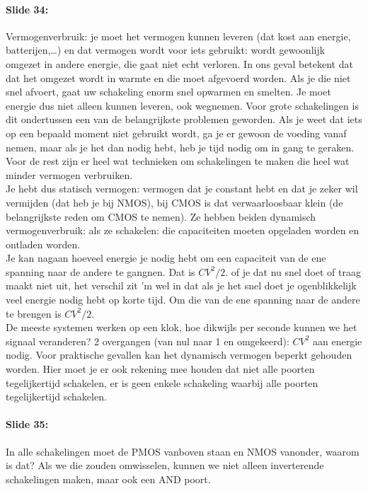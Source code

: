 \documentclass[10pt,a4paper]{book}
\begin{document}
\paragraph{Slide 34:} Vermogenverbruik: je moet het vermogen kunnen leveren (dat kost aan energie, batterijen,\ldots) en dat vermogen wordt voor iets gebruikt: wordt gewoonlijk omgezet in andere energie, die gaat niet echt verloren. In ons geval betekent dat dat het omgezet wordt in warmte en die moet afgevoerd worden. Als je die niet snel afvoert, gaat uw schakeling enorm snel opwarmen en smelten. Je moet energie dus niet alleen kunnen leveren, ook wegnemen. Voor grote schakelingen is dit ondertussen een van de belangrijkste problemen geworden. Als je weet dat iets op een bepaald moment niet gebruikt wordt, ga je er gewoon de voeding vanaf nemen, maar als je het dan nodig hebt, heb je tijd nodig om in gang te geraken. Voor de rest zijn er heel wat technieken om schakelingen te maken die heel wat minder vermogen verbruiken.\\
Je hebt dus statisch vermogen: vermogen dat je constant hebt en dat je zeker wil vermijden (dat heb je bij NMOS), bij CMOS is dat verwaarloosbaar klein (de belangrijkste reden om CMOS te nemen). Ze hebben beiden dynamisch vermogenverbruik: als ze schakelen: die capaciteiten moeten opgeladen worden en ontladen worden. \\
Je kan nagaan hoeveel energie je nodig hebt om een capaciteit van de ene spanning naar de andere te gangnen. Dat is $CV^2/2$. of je dat nu snel doet of traag maakt niet uit, het verschil zit 'm wel in dat als je het snel doet je ogenblikkelijk veel energie nodig hebt op korte tijd. Om die van de ene spanning naar de andere te brengen is $CV^2/2$.\\
De meeste systemen werken op een klok, hoe dikwijls per seconde kunnen we het signaal veranderen? 2 overgangen (van nul naar 1 en omgekeerd): $CV^2$ aan energie nodig. Voor praktische gevallen kan het dynamisch vermogen beperkt gehouden worden. Hier moet je er ook rekening mee houden dat niet alle poorten tegelijkertijd schakelen, er is geen enkele schakeling waarbij alle poorten tegelijkertijd schakelen. 

\paragraph{Slide 35:} In alle schakelingen moet de PMOS vanboven staan en NMOS vanonder, waarom is dat? Als we die zouden omwisselen, kunnen we niet alleen inverterende schakelingen maken, maar ook een AND poort. 
\end{document}
